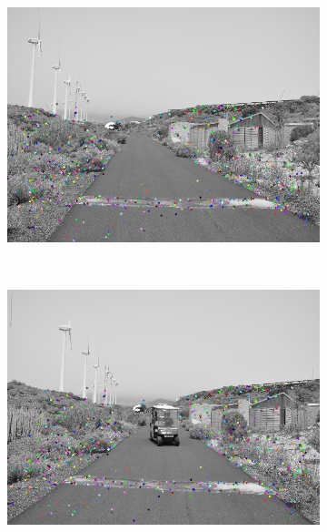\begin{figure}[t]
\begin{subfigure}[b]{0.24\columnwidth}
	    \includegraphics[width=\textwidth]{pipeline2/fig2}\label{fig:pipelineB_1}
        \end{subfigure}%
        ~
        \begin{subfigure}[b]{0.24\columnwidth}
	    \includegraphics[width=\textwidth]{pipeline2/fig1}\label{fig:pipelineB_2}
        \end{subfigure}%
        ~
        \begin{subfigure}[b]{0.24\columnwidth}

\end{subfigure}
\end{figure}
